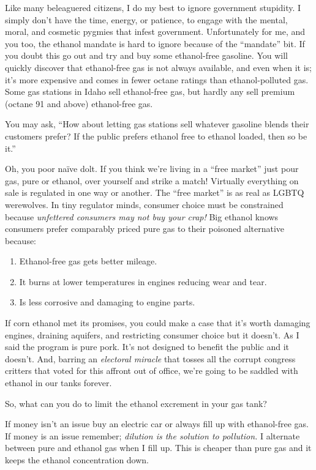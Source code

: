 Like many beleaguered citizens, I do my best to ignore government
stupidity. I simply don't have the time, energy, or patience, to engage
with the mental, moral, and cosmetic pygmies that infest government.
Unfortunately for me, and you too, the ethanol mandate is hard to ignore
because of the ``mandate'' bit. If you doubt this go out and try and buy
some ethanol-free gasoline. You will quickly discover that ethanol-free
gas is not always available, and even when it is; it's more expensive
and comes in fewer octane ratings than ethanol-polluted gas. Some gas
stations in Idaho sell ethanol-free gas, but hardly any sell premium
(octane 91 and above) ethanol-free gas.

You may ask, ``How about letting gas stations sell whatever gasoline
blends their customers prefer? If the public prefers ethanol free to
ethanol loaded, then so be it.''

Oh, you poor naïve dolt. If you think we're living in a ``free market''
just pour gas, pure or ethanol, over yourself and strike a match!
Virtually everything on sale is regulated in one way or another. The
``free market'' is as real as LGBTQ werewolves. In tiny regulator minds,
consumer choice must be constrained because \emph{unfettered consumers
may not buy your crap!} Big ethanol knows consumers prefer comparably
priced pure gas to their poisoned alternative because:

\begin{enumerate}
\def\labelenumi{\arabic{enumi}.}
\tightlist
\item
  Ethanol-free gas gets better mileage.
\item
  It burns at lower temperatures in engines reducing wear and tear.
\item
  Is less corrosive and damaging to engine parts.
\end{enumerate}

If corn ethanol met its promises, you could make a case that it's worth
damaging engines, draining aquifers, and restricting consumer choice but
it doesn't. As I said the program is pure pork. It's not designed to
benefit the public and it doesn't. And, barring an \emph{electoral
miracle} that tosses all the corrupt congress critters that voted for
this affront out of office, we're going to be saddled with ethanol in
our tanks forever.

So, what can you do to limit the ethanol excrement in your gas tank?

If money isn't an issue buy an electric car or always fill up with
ethanol-free gas. If money is an issue remember; \emph{dilution is the
solution to pollution.} I alternate between pure and ethanol gas when I
fill up. This is cheaper than pure gas and it keeps the ethanol
concentration down.

